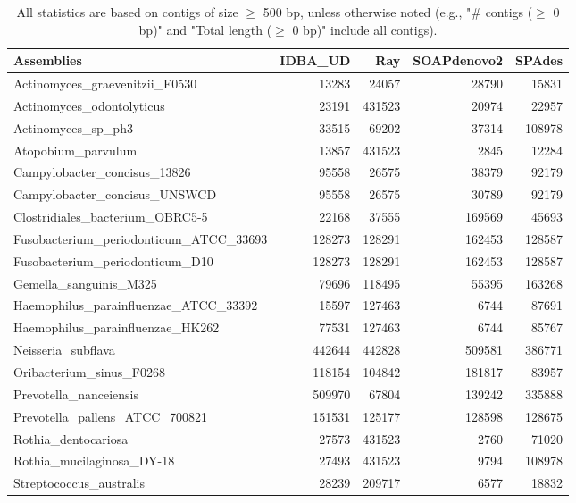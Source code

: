 \documentclass[12pt,a4paper]{article}
\begin{document}
\begin{table}[ht]
\begin{center}
\caption{All statistics are based on contigs of size $\geq$ 500 bp, unless otherwise noted (e.g., "\# contigs ($\geq$ 0 bp)" and "Total length ($\geq$ 0 bp)" include all contigs).}
\begin{tabular}{|l*{4}{|r}|}
\hline
Assemblies & IDBA\_UD & Ray & SOAPdenovo2 & SPAdes \\ \hline
Actinomyces\_graevenitzii\_F0530 & 13283 & 24057 & 28790 & 15831 \\ \hline
Actinomyces\_odontolyticus & 23191 & 431523 & 20974 & 22957 \\ \hline
Actinomyces\_sp\_ph3 & 33515 & 69202 & 37314 & 108978 \\ \hline
Atopobium\_parvulum & 13857 & 431523 & 2845 & 12284 \\ \hline
Campylobacter\_concisus\_13826 & 95558 & 26575 & 38379 & 92179 \\ \hline
Campylobacter\_concisus\_UNSWCD & 95558 & 26575 & 30789 & 92179 \\ \hline
Clostridiales\_bacterium\_OBRC5-5 & 22168 & 37555 & 169569 & 45693 \\ \hline
Fusobacterium\_periodonticum\_ATCC\_33693 & 128273 & 128291 & 162453 & 128587 \\ \hline
Fusobacterium\_periodonticum\_D10 & 128273 & 128291 & 162453 & 128587 \\ \hline
Gemella\_sanguinis\_M325 & 79696 & 118495 & 55395 & 163268 \\ \hline
Haemophilus\_parainfluenzae\_ATCC\_33392 & 15597 & 127463 & 6744 & 87691 \\ \hline
Haemophilus\_parainfluenzae\_HK262 & 77531 & 127463 & 6744 & 85767 \\ \hline
Neisseria\_subflava & 442644 & 442828 & 509581 & 386771 \\ \hline
Oribacterium\_sinus\_F0268 & 118154 & 104842 & 181817 & 83957 \\ \hline
Prevotella\_nanceiensis & 509970 & 67804 & 139242 & 335888 \\ \hline
Prevotella\_pallens\_ATCC\_700821 & 151531 & 125177 & 128598 & 128675 \\ \hline
Rothia\_dentocariosa & 27573 & 431523 & 2760 & 71020 \\ \hline
Rothia\_mucilaginosa\_DY-18 & 27493 & 431523 & 9794 & 108978 \\ \hline
Streptococcus\_australis & 28239 & 209717 & 6577 & 18832 \\ \hline

\end{tabular}
\end{center}
\end{table}
\end{document}
